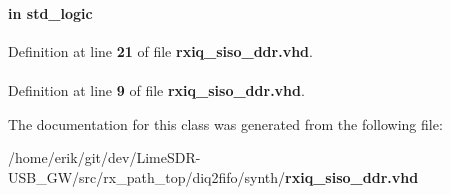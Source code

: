\paragraph[{reset\+\_\+n}]{ {\bfseries \textcolor{keywordflow}{in}\textcolor{vhdlchar}{ }} {\bfseries \textcolor{comment}{std\+\_\+logic}\textcolor{vhdlchar}{ }} \hspace{0.3cm}{\ttfamily [Port]}}\label{classrxiq__siso__ddr_a446ea52ed8c4a84181a47d9165ce41a5}


Definition at line {\bf 21} of file {\bf rxiq\+\_\+siso\+\_\+ddr.\+vhd}.

\paragraph[{std\+\_\+logic\+\_\+1164}]{\hspace{0.3cm}{\ttfamily [Package]}}\label{classrxiq__siso__ddr_acd03516902501cd1c7296a98e22c6fcb}


Definition at line {\bf 9} of file {\bf rxiq\+\_\+siso\+\_\+ddr.\+vhd}.



The documentation for this class was generated from the following file\+:\begin{DoxyCompactItemize}
\item 
/home/erik/git/dev/\+Lime\+S\+D\+R-\/\+U\+S\+B\+\_\+\+G\+W/src/rx\+\_\+path\+\_\+top/diq2fifo/synth/{\bf rxiq\+\_\+siso\+\_\+ddr.\+vhd}\end{DoxyCompactItemize}
